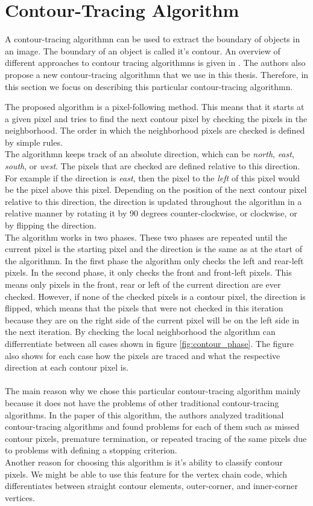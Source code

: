 \documentclass[thesis.tex]{subfiles}
\begin{document}
\section{Contour-Tracing Algorithm} \label{contourtracingalgorithm}
A contour-tracing algorithmn can be used to extract the boundary of objects in an image. The boundary of an object is called it's contour. An overview of different approaches to contour tracing algorithmns is given in \cite{seo2016fast}. The authors also propose a new contour-tracing algorithmn that we use in this thesis. Therefore, in this section we focus on describing this particular contour-tracing algorithmn.

The proposed algorithm is a pixel-following method. This means that it starts at a given pixel and tries to find the next contour pixel by checking the pixels in the neighborhood. The order in which the neighborhood pixels are checked is defined by simple rules. \\ The algorithmn keeps track of an absolute direction, which can be \textit{north}, \textit{east}, \textit{south}, or \textit{west}. The pixels that are checked are defined relative to this direction. For example if the direction is \textit{east}, then the pixel to the \textit{left} of this pixel would be the pixel above this pixel. Depending on the position of the next contour pixel relative to this direction, the direction is updated throughout the algorithm in a relative manner by rotating it by 90 degrees counter-clockwise, or clockwise, or by flipping the direction.\\  
The algorithm works in two phases. These two phases are repeated until the current pixel is the starting pixel and the direction is the same as at the start of the algorithmn. In the first phase the algorithm only checks the left and rear-left pixels. In the second phase, it only checks the front and front-left pixels. This means only pixels in the front, rear or left of the current direction are ever checked. However, if none of the checked pixels is a contour pixel, the direction is flipped, which means that the pixels that were not checked in this iteration because they are on the right side of the current pixel will be on the left side in the next iteration. By checking the local neighborhood the algorithm can differrentiate between all cases shown in figure \ref{fig:contour_phase}. The figure also shows for each case how the pixels are traced and what the respective direction at each contour pixel is.  \\ \\
The main reason why we chose this particular contour-tracing algorithm mainly because it does not have the problems of other traditional contour-tracing algorithms. In the paper of this algorithm, the authors analyzed traditional contour-tracing algorithms and found problems for each of them such as missed contour pixels, premature termination, or repeated tracing of the same pixels due to problems with defining a stopping criterion. \\
Another reason for choosing this algorithm is it's ability to classify contour pixels. We might be able to use this feature for the vertex chain code, which differentiates between straight contour elements, outer-corner, and  inner-corner vertices.
\end{document}
